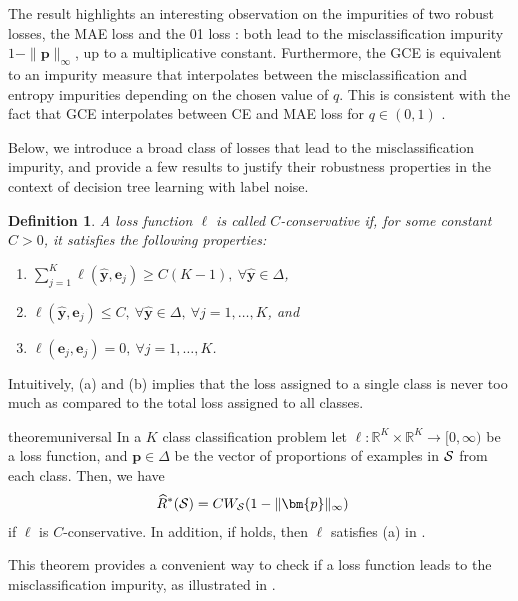 \documentclass[letterpaper]{article} %
\newcommand{\R}{{\mathbb{R}}}
\newcommand{\bp}{{\bm{p}}}
\newcommand{\by}{{\bm{y}}}
\newcommand{\be}{{\bm{e}}}
\newcommand{\cS}{{\cal{S}}}
\newcommand{\WS}{{W_{\cal{S}}}}
\newcommand{\simplex}{\Delta}
\newcommand{\argmax}{\mathrm{argmax}}
\newtheorem{defn}{Definition}
\begin{document}
The result highlights an interesting observation on the impurities of
two robust losses, the MAE loss and the 01 loss \cite{ghosh2017robust}:
both lead to the misclassification impurity
$1 - \|\bp\|_{\infty}$, up to a multiplicative constant.
Furthermore, the GCE is equivalent to an impurity measure that interpolates
between the misclassification and entropy impurities depending on the chosen
value of $q$.
This is consistent with the fact that GCE interpolates between CE and MAE loss
for $q \in (0, 1)$ \cite{zhang2018generalized}.

Below, we introduce a broad class of losses that lead to the misclassification
impurity, and provide a few results to justify their robustness properties in
the context of decision tree learning with label noise.
\begin{defn} \label{defn:conservative}
A loss function $\ell$ is called \emph{$C$-conservative} if,
for some constant $C>0$,
it satisfies the following properties:
\begin{enumerate}
	\item[(a)] $\sum_{j=1}^K\ell(\widehat{\by},\be_j) \geq C(K-1),\
		\forall\widehat{\by}\in \simplex$,
	\item[(b)] $\ell(\widehat{\by},\be_j)\leq C,\
		\forall\widehat{\by}\in \simplex,\ \forall j=1,\ldots,K$, and
	\item[(c)] $\ell(\be_j,\be_j)=0,\ \forall j=1,\ldots,K$.
\end{enumerate}
\end{defn}
Intuitively, (a) and (b) implies that the loss assigned to a single class is
never too much as compared to the total loss assigned to all classes.

\begin{restatable}{theorem}{universal}
\label{thm:universal}
    In a $K$ class classification problem let $\ell:\R^K\times \R^K\to [0,\infty)$ be a loss function,
    and
		$\bp\in\simplex$ be the vector of proportions of examples in $\cS$ from each class.
		Then, we have
    \begin{align}
        \widehat{R}^*(\cS) &= C\WS (1-\|\bp\|_\infty) \label{eq:misclassification_impurity}
    \end{align}
    if $\ell$ is $C$-conservative.
    In addition, if  holds, then $\ell$ satisfies (a)
    in \Cref{defn:conservative}.
\end{restatable}
This theorem provides a convenient way to check if a loss function leads to the
misclassification impurity, as illustrated in .
\end{document}
